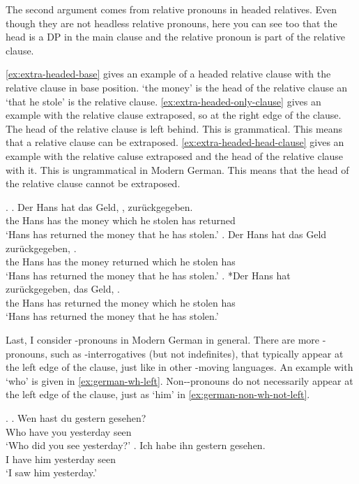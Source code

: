 The second argument comes from relative pronouns in headed relatives. Even though they are not headless relative pronouns, here you can see too that the head is a DP in the main clause and the relative pronoun is part of the relative clause.

\ref{ex:extra-headed-base} gives an example of a headed relative clause with the relative clause in base position.  `the money' is the head of the relative clause an  `that he stole' is the relative clause.
\ref{ex:extra-headed-only-clause} gives an example with the relative clause extraposed, so at the right edge of the clause. The head of the relative clause is left behind. This is grammatical. This means that a relative clause can be extraposed.
\ref{ex:extra-headed-head-clause} gives an example with the relative caluse extraposed and the head of the relative clause with it. This is ungrammatical in Modern German. This means that the head of the relative clause cannot be extraposed.

\ex. \citet[185]{groos1981}\label{ex:extra-headed}
\ag. Der Hans hat das Geld,    , zurückgegeben.\\
the Hans has the money which he stolen has returned\\
\glt `Hans has returned the money that he has stolen.'\label{ex:extra-headed-base}
\bg. Der Hans hat das Geld zurückgegeben,    .\\
the Hans has the money returned which he stolen has\\
\glt `Hans has returned the money that he has stolen.'\label{ex:extra-headed-only-clause}
\cg. *Der Hans hat zurückgegeben, das Geld,    .\\
the Hans has returned the money which he stolen has\\
\glt `Hans has returned the money that he has stolen.'\label{ex:extra-headed-head-clause}

Last, I consider -pronouns in Modern German in general. There are more -pronouns, such as -interrogatives (but not indefinites), that typically appear at the left edge of the clause, just like in other -moving languages. An example with  `who' is given in \ref{ex:german-wh-left}. Non--pronouns do not necessarily appear at the left edge of the clause, just as  `him' in \ref{ex:german-non-wh-not-left}.

\ex.
\ag. Wen hast du gestern gesehen?\\
 Who have you yesterday seen\\
 `Who did you see yesterday?'\label{ex:german-wh-left}
\bg. Ich habe ihn gestern gesehen.\\
 I have him yesterday seen\\
 `I saw him yesterday.'\label{ex:german-non-wh-not-left}


